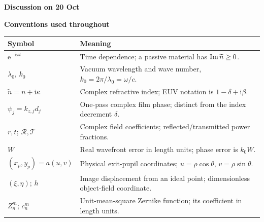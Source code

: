 \documentclass[11pt,a4paper]{article}
\newcommand{\ii}{\mathrm{i}}\newcommand{\dd}{\mathrm{d}}
\newcommand{\ee}{\mathrm{e}}\newcommand{\bn}{\widetilde n}
\numberwithin{equation}{section}
\begin{document}
\begin{center}
{\LARGE\bfseries Discussion on 20 Oct}
\end{center}
\vspace{3mm}

\textbf{Conventions used throughout}\par\smallskip
\begin{tabularx}{\textwidth}{@{}lY@{}}\toprule
Symbol & Meaning\\\midrule
$\ee^{-\ii\omega t}$ & Time dependence; a passive material has $\Ima\bn\geq0$.\\
$\lambda_0$, $k_0$ & Vacuum wavelength and wave number, $k_0=2\pi/\lambda_0=\omega/c$.\\
$\bn=n+\ii\kappa$ & Complex refractive index; EUV notation is $1-\delta+\ii\beta$.\\
$\psi_j=k_{z,j}d_j$ & One-pass complex film phase; distinct from the index decrement $\delta$.\\
$r,t$; $\mathcal R,\mathcal T$ & Complex field coefficients; reflected/transmitted power fractions.\\
$W$ & Real wavefront error in length units; phase error is $k_0W$.\\
$(x_p,y_p)=a(u,v)$ & Physical exit-pupil coordinates; $u=\rho\cos\theta$, $v=\rho\sin\theta$.\\
$(\xi,\eta)$; $h$ & Image displacement from an ideal point; dimensionless object-field coordinate.\\
$Z_n^m$; $c_n^m$ & Unit-mean-square Zernike function; its coefficient in length units.\\\bottomrule
\end{tabularx}








\end{document}
